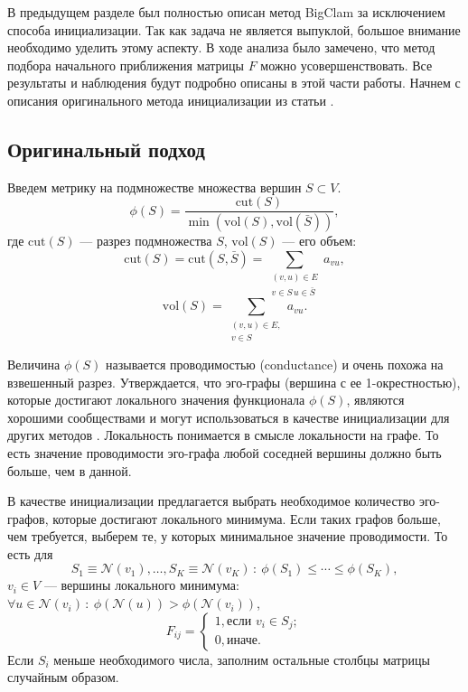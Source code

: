 \documentclass{ITaSconf}
\begin{document}
	В предыдущем разделе был полностью описан метод BigClam за исключением способа инициализации. 
	Так как задача не является выпуклой, большое внимание необходимо уделить этому аспекту. 
	В ходе анализа было замечено, что метод подбора начального приближения матрицы $F$ можно усовершенствовать. 
	Все результаты и наблюдения будут подробно описаны в этой части работы. 
	Начнем с описания оригинального метода инициализации из статьи \cite{gleich2011neighborhoods}. 
	
	\subsection{Оригинальный подход}
	
	Введем метрику на подмножестве множества вершин $ S \subset V $.
	$$\phi(S) = \dfrac{\mathrm{cut}(S)}{\min(\mathrm{vol}(S), \mathrm{vol}( \bar S))},$$
	где $\mathrm{cut}(S)$ --- разрез подмножества $S$, $\mathrm{vol}(S)$ --- его объем:
	$$\mathrm{cut}(S) = \mathrm{cut}(S, \bar S)=\sum_{\substack{(v,u)\in E\\ v \in S \, u \in \bar S}} a_{vu},$$
	$$\mathrm{vol}(S) =\sum_{\substack{(v,u)\in E,\\ v \in S}} a_{vu}.$$
	
	Величина $\phi(S)$ называется проводимостью (conductance) и очень похожа на взвешенный разрез.
	Утверждается, что эго-графы (вершина с ее 1-окрестностью), которые достигают локального значения функционала $\phi(S)$,  являются хорошими сообществами и могут использоваться в качестве инициализации для других методов \cite{gleich2011neighborhoods}.
	Локальность понимается в смысле локальности на графе. 
	То есть значение проводимости эго-графа любой соседней вершины должно быть больше, чем в данной. 
	
	В качестве инициализации предлагается выбрать необходимое количество эго-графов, которые достигают локального минимума. Если таких графов больше, чем требуется, выберем те, у которых минимальное значение проводимости.
	То есть для 
	$$S_1 \equiv \mathcal{N}(v_1), \dots, S_K \equiv \mathcal{N}(v_K)\,:\:\phi(S_1) \le \cdots \le \phi(S_K),$$
	$v_i \in V$ --- вершины локального минимума: $\forall u \in \mathcal{N}(v_i) \, : \: \phi(\mathcal{N}(u)) > \phi(\mathcal{N}(v_i))$,
	$$ 
	F_{ij}=	
	\begin{cases} 	1,  \text{если } v_i \in S_j;\\
	0,  \text{иначе. } 
	\end{cases}
	$$
	Если $S_i$ меньше необходимого числа, заполним остальные столбцы матрицы случайным образом.
	
\end{document}
